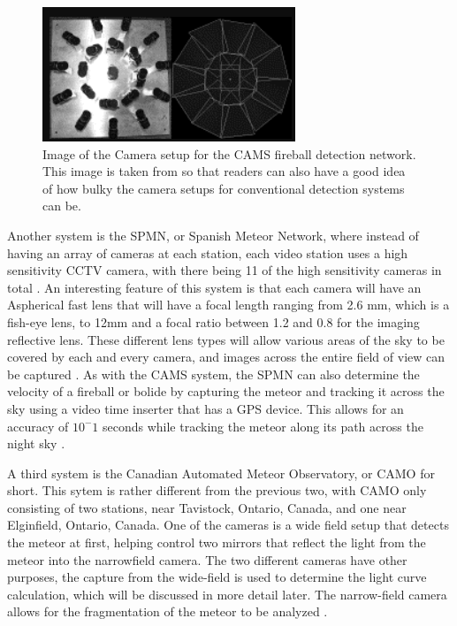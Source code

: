 \begin{figure}
    \centering
    \includegraphics[scale=1.5]{CAMS-Camera-Setup.png}
    \caption{Image of the Camera setup for the CAMS fireball detection network. This image is taken from \cite{jenniskens} so that readers can also have a good idea of how bulky the camera setups for conventional detection systems can be.}
    \label{Figure 5}
\end{figure}

Another system is the SPMN, or Spanish Meteor Network, where instead of having an array of cameras at each station, each video station uses a high sensitivity CCTV camera, with there being 11 of the high sensitivity cameras in total \cite{SPMN}. 
An interesting feature of this system is that each camera will have an Aspherical fast lens that will have a focal length ranging from 2.6 mm, which is a fish-eye lens, to 12mm and a focal ratio between 1.2 and 0.8 for the imaging reflective lens. 
These different lens types will allow various areas of the sky to be covered by each and every camera, and images across the entire field of view can be captured \cite{SPMN}.
As with the CAMS system, the SPMN can also determine the velocity of a fireball or bolide by capturing the meteor and tracking it across the sky using a video time inserter that has a GPS device. 
This allows for an accuracy of $10^-1$ seconds while tracking the meteor along its path across the night sky \cite{SPMN}.

A third system is the Canadian Automated Meteor Observatory, or CAMO for short.
This sytem is rather different from the previous two, with CAMO only consisting of two stations, near Tavistock, Ontario, Canada, and one near Elginfield, Ontario, Canada.
One of the cameras is a wide field setup that detects the meteor at first, helping control two mirrors that reflect the light from the meteor into the narrowfield camera\cite{subasinghe_campbell-brown_2018}.
The two different cameras have other purposes, the capture from the wide-field is used to determine the light curve calculation, which will be discussed in more detail later\cite{subasinghe_campbell-brown_2018}.
The narrow-field camera allows for the fragmentation of the meteor to be analyzed \cite{subasinghe_campbell-brown_2018}.


